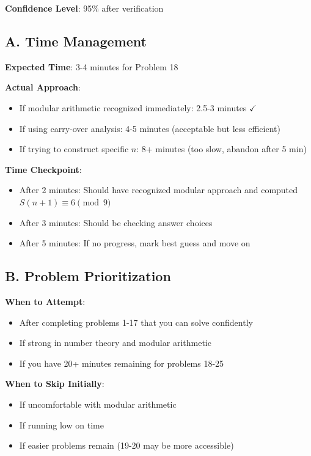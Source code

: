 \documentclass[]{article}
\begin{document}
\begin{solutionbox}
\textbf{Confidence Level}: 95\% after verification
\end{solutionbox}

\begin{competitionbox}
\subsection*{A. Time Management}

\textbf{Expected Time}: 3-4 minutes for Problem 18

\textbf{Actual Approach}:
\begin{itemize}
    \item If modular arithmetic recognized immediately: 2.5-3 minutes $\checkmark$
    \item If using carry-over analysis: 4-5 minutes (acceptable but less efficient)
    \item If trying to construct specific $n$: 8+ minutes (too slow, abandon after 5 min)
\end{itemize}

\textbf{Time Checkpoint}:
\begin{itemize}
    \item After 2 minutes: Should have recognized modular approach and computed $S(n+1) \equiv 6 \pmod{9}$
    \item After 3 minutes: Should be checking answer choices
    \item After 5 minutes: If no progress, mark best guess and move on
\end{itemize}

\subsection*{B. Problem Prioritization}

\textbf{When to Attempt}:
\begin{itemize}
    \item After completing problems 1-17 that you can solve confidently
    \item If strong in number theory and modular arithmetic
    \item If you have 20+ minutes remaining for problems 18-25
\end{itemize}

\textbf{When to Skip Initially}:
\begin{itemize}
    \item If uncomfortable with modular arithmetic
    \item If running low on time
    \item If easier problems remain (19-20 may be more accessible)
\end{itemize}


\end{competitionbox}
\end{document}
